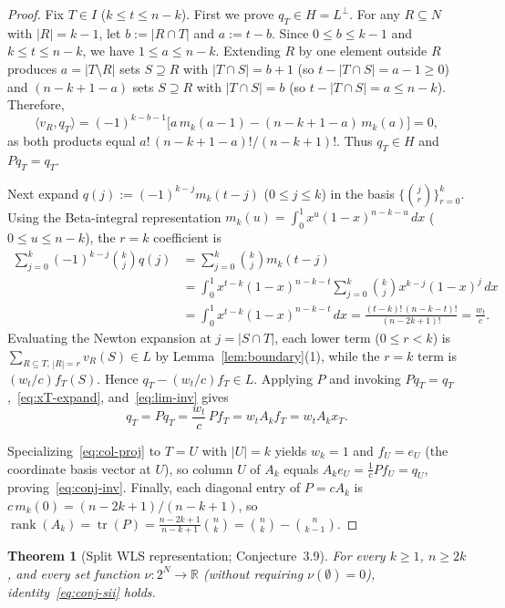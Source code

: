 \documentclass[11pt]{article}
\theoremstyle{plain}
\newtheorem{theorem}{Theorem}
\theoremstyle{definition}
\theoremstyle{remark}
\DeclareMathOperator{\rank}{rank}
\DeclareMathOperator{\tr}{tr}
\begin{document}
\begin{proof}
Fix $T \in I$ ($k \le t \le n - k$). First we prove $q_T \in H = L^\perp$. For any $R \subseteq N$ with $|R| = k - 1$, let $b := |R \cap T|$ and $a := t - b$. Since $0 \le b \le k - 1$ and $k \le t \le n - k$, we have $1 \le a \le n - k$. Extending $R$ by one element outside $R$ produces $a = |T \setminus R|$ sets $S \supseteq R$ with $|T \cap S| = b + 1$ (so $t - |T \cap S| = a - 1 \ge 0$) and $(n - k + 1 - a)$ sets $S \supseteq R$ with $|T \cap S| = b$ (so $t - |T \cap S| = a \le n - k$). Therefore,
\[
\langle v_R, q_T \rangle = (-1)^{k - b - 1}\bigl[a\,m_k(a - 1) - (n - k + 1 - a)\,m_k(a)\bigr] = 0,
\]
as both products equal $a!\,(n - k + 1 - a)!/(n - k + 1)!$. Thus $q_T \in H$ and $P q_T = q_T$.

Next expand $q(j) := (-1)^{k - j} m_k(t - j)$ ($0 \le j \le k$) in the basis $\bigl\{\binom{j}{r}\bigr\}_{r=0}^k$. Using the Beta-integral representation $m_k(u) = \int_0^1 x^u(1 - x)^{n - k - u}\,dx$ ($0 \le u \le n - k$), the $r = k$ coefficient is
\begin{align*}
\sum_{j=0}^k (-1)^{k - j} \binom{k}{j} q(j)
&= \sum_{j=0}^k \binom{k}{j} m_k(t - j) \\
&= \int_0^1 x^{t - k}(1 - x)^{n - k - t} \sum_{j=0}^k \binom{k}{j} x^{k - j}(1 - x)^j\,dx \\
&= \int_0^1 x^{t - k}(1 - x)^{n - k - t}\,dx
= \frac{(t - k)!\,(n - k - t)!}{(n - 2k + 1)!}
= \frac{w_t}{c}.
\end{align*}
Evaluating the Newton expansion at $j = |S \cap T|$, each lower term ($0 \le r < k$) is $\sum_{R \subseteq T,\, |R|=r} v_R(S) \in L$ by Lemma~\ref{lem:boundary}(1), while the $r = k$ term is $(w_t / c) f_T(S)$. Hence $q_T - (w_t / c) f_T \in L$. Applying $P$ and invoking $P q_T = q_T$,~\eqref{eq:xT-expand}, and~\eqref{eq:lim-inv} gives
\[
q_T = P q_T = \frac{w_t}{c}\, P f_T = w_t A_k f_T = w_t A_k x_T.
\]

Specializing~\eqref{eq:col-proj} to $T = U$ with $|U| = k$ yields $w_k = 1$ and $f_U = e_U$ (the coordinate basis vector at $U$), so column $U$ of $A_k$ equals $A_k e_U = \frac{1}{c} P f_U = q_U$, proving~\eqref{eq:conj-inv}. Finally, each diagonal entry of $P = c A_k$ is $c\,m_k(0) = (n - 2k + 1)/(n - k + 1)$, so $\rank(A_k) = \tr(P) = \frac{n - 2k + 1}{n - k + 1}\binom{n}{k} = \binom{n}{k} - \binom{n}{k - 1}$.
\end{proof}

\begin{theorem}[Split WLS representation; Conjecture~3.9]\label{thm:split}
For every $k \ge 1$, $n \ge 2k$, and every set function $\nu : 2^N \to \mathbb{R}$ (without requiring $\nu(\emptyset) = 0$), identity~\eqref{eq:conj-sii} holds.
\end{theorem}
\end{document}
